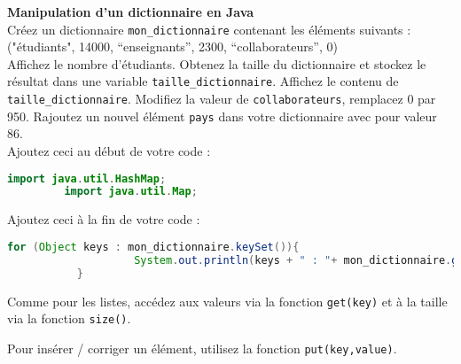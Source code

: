     \begin{Exercice}[15 minutes] \textbf{Manipulation d'un dictionnaire en Java}\\
      	Créez un dictionnaire \lstinline{mon_dictionnaire} contenant les éléments suivants : \\
      	
      	("étudiants", 14000, ``enseignants'', 2300, ``collaborateurs'', 0) \\
      	
          Affichez le nombre d'étudiants. Obtenez la taille du dictionnaire et stockez le résultat dans une variable \lstinline{taille_dictionnaire}. Affichez le contenu de \lstinline{taille_dictionnaire}. 
          Modifiez la valeur de \lstinline{collaborateurs}, remplacez 0 par 950. Rajoutez un nouvel élément \lstinline{pays} dans votre dictionnaire avec pour valeur 86.\\
      	
      	Ajoutez ceci au début de votre code :
       
      	\begin{lstlisting}[language=Java]
             import java.util.HashMap;
	     import java.util.Map; \end{lstlisting}
	     
	     Ajoutez ceci à la fin de votre code :
	     
	    \begin{lstlisting}[language=Java]
             for (Object keys : mon_dictionnaire.keySet()){
            		System.out.println(keys + " : "+ mon_dictionnaire.get(keys));
	       } \end{lstlisting} 
    
        \begin{conseil}
           Comme pour les listes, accédez aux valeurs via la fonction \lstinline{get(key)} et à la taille via la fonction \lstinline{size()}.
            
           Pour insérer / corriger un élément, utilisez la fonction \lstinline{put(key,value)}.
		     
        \end{conseil}
        
        \begin{solution}
            
        \end{solution}
    \end{Exercice}
    
